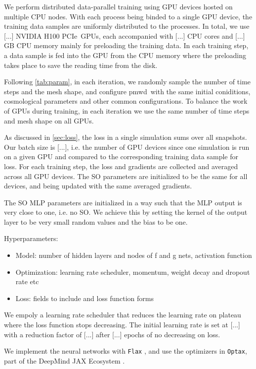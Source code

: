 \documentclass[modern, trackchanges, dvipsnames]{aastex631}
\newcommand{\pmwd}{{\usefont{T1}{nova}{m}{sl}pmwd}}
\newcommand{\GPU}{NVIDIA H100 PCIe}  %
\begin{document}
We perform distributed data-parallel training using GPU devices hosted on
multiple CPU nodes.
With each process being binded to a single GPU device, the training data samples
are uniformly distributed to the processes.
In total, we use [...] \GPU\ GPUs, each accompanied with [...] CPU cores and
[...] GB CPU memory mainly for preloading the training data.
In each training step, a data sample is fed into the GPU from the CPU memory
where the preloading takes place to save the reading time from the disk.

Following \autoref{tab:param}, in each iteration, we randomly sample the number
of time steps and the mesh shape, and configure \pmwd\ with the same initial
coniditions, cosmological parameters and other common configurations.
To balance the work of GPUs during training, in each iteration we use
the same number of time steps and mesh shape on all GPUs.

As discussed in \autoref{sec:loss}, the loss in a single simulation sums over
all snapshots.
Our batch size is [...], i.e. the number of GPU devices since one simulation is
run on a given GPU and compared to the corresponding training data sample for
loss.
For each training step, the loss and gradients are collected and averaged across
all GPU devices.
The SO parameters are initialized to be the same for all devices, and being
updated with the same averaged gradients.

The SO MLP parameters are initialized in a way such that the MLP output is very
close to one, i.e. no SO.
We achieve this by setting the kernel of the output layer to be very small
random values and the bias to be one.

Hyperparameters:
\begin{itemize}
  \item Model: number of hidden layers and nodes of f and g nets, activation function
  \item Optimization: learning rate scheduler, momentum, weight decay and dropout rate etc
  \item Loss: fields to include and loss function forms
\end{itemize}

We empoly a learning rate scheduler that reduces the learning rate on plateau
where the loss function stops decreasing.
The initial learning rate is set at [...] with a reduction factor of [...] after
[...] epochs of no decreasing on loss.


We implement the neural networks with \texttt{Flax} \citep{flax2020github}, and
use the optimizers in \texttt{Optax}, part of the DeepMind JAX Ecosystem
\citep{deepmind2020jax}.
\end{document}
